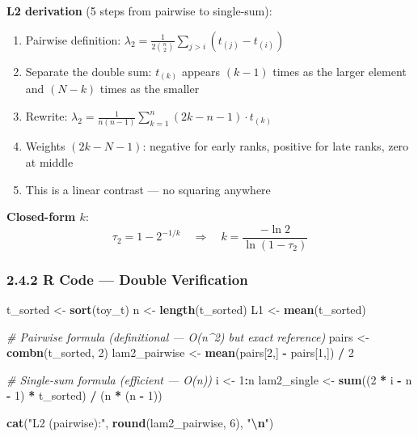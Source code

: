 \documentclass[
]{article}
\newenvironment{Shaded}{\begin{snugshade}}{\end{snugshade}}
\newcommand{\CommentTok}[1]{\textcolor[rgb]{0.56,0.35,0.01}{\textit{#1}}}
\newcommand{\DecValTok}[1]{\textcolor[rgb]{0.00,0.00,0.81}{#1}}
\newcommand{\FunctionTok}[1]{\textcolor[rgb]{0.13,0.29,0.53}{\textbf{#1}}}
\newcommand{\NormalTok}[1]{#1}
\newcommand{\OtherTok}[1]{\textcolor[rgb]{0.56,0.35,0.01}{#1}}
\newcommand{\SpecialCharTok}[1]{\textcolor[rgb]{0.81,0.36,0.00}{\textbf{#1}}}
\newcommand{\StringTok}[1]{\textcolor[rgb]{0.31,0.60,0.02}{#1}}
\providecommand{\tightlist}{%
  \setlength{\itemsep}{0pt}\setlength{\parskip}{0pt}}
\begin{document}
\textbf{L2 derivation} (5 steps from pairwise to single-sum):

\begin{enumerate}
\def\labelenumi{\arabic{enumi}.}
\tightlist
\item
  Pairwise definition:
  \(\lambda_2 = \frac{1}{2\binom{n}{2}} \sum_{j>i}(t_{(j)} - t_{(i)})\)
\item
  Separate the double sum: \(t_{(k)}\) appears \((k-1)\) times as the
  larger element and \((N-k)\) times as the smaller
\item
  Rewrite:
  \(\lambda_2 = \frac{1}{n(n-1)} \sum_{k=1}^n (2k - n - 1) \cdot t_{(k)}\)
\item
  Weights \((2k-N-1)\): negative for early ranks, positive for late
  ranks, zero at middle
\item
  This is a linear contrast --- no squaring anywhere
\end{enumerate}

\textbf{Closed-form \(k\)}:
\[\tau_2 = 1 - 2^{-1/k} \quad \Rightarrow \quad k = \frac{-\ln 2}{\ln(1-\tau_2)}\]

\subsubsection{2.4.2 R Code --- Double
Verification}\label{r-code-double-verification}

\begin{Shaded}
\begin{Highlighting}[]
\NormalTok{t\_sorted }\OtherTok{\textless{}{-}} \FunctionTok{sort}\NormalTok{(toy\_t)}
\NormalTok{n }\OtherTok{\textless{}{-}} \FunctionTok{length}\NormalTok{(t\_sorted)}
\NormalTok{L1 }\OtherTok{\textless{}{-}} \FunctionTok{mean}\NormalTok{(t\_sorted)}

\CommentTok{\# Pairwise formula (definitional — O(n\^{}2) but exact reference)}
\NormalTok{pairs }\OtherTok{\textless{}{-}} \FunctionTok{combn}\NormalTok{(t\_sorted, }\DecValTok{2}\NormalTok{)}
\NormalTok{lam2\_pairwise }\OtherTok{\textless{}{-}} \FunctionTok{mean}\NormalTok{(pairs[}\DecValTok{2}\NormalTok{,] }\SpecialCharTok{{-}}\NormalTok{ pairs[}\DecValTok{1}\NormalTok{,]) }\SpecialCharTok{/} \DecValTok{2}

\CommentTok{\# Single{-}sum formula (efficient — O(n))}
\NormalTok{i }\OtherTok{\textless{}{-}} \DecValTok{1}\SpecialCharTok{:}\NormalTok{n}
\NormalTok{lam2\_single }\OtherTok{\textless{}{-}} \FunctionTok{sum}\NormalTok{((}\DecValTok{2} \SpecialCharTok{*}\NormalTok{ i }\SpecialCharTok{{-}}\NormalTok{ n }\SpecialCharTok{{-}} \DecValTok{1}\NormalTok{) }\SpecialCharTok{*}\NormalTok{ t\_sorted) }\SpecialCharTok{/}\NormalTok{ (n }\SpecialCharTok{*}\NormalTok{ (n }\SpecialCharTok{{-}} \DecValTok{1}\NormalTok{))}

\FunctionTok{cat}\NormalTok{(}\StringTok{"L2 (pairwise):"}\NormalTok{, }\FunctionTok{round}\NormalTok{(lam2\_pairwise, }\DecValTok{6}\NormalTok{), }\StringTok{"}\SpecialCharTok{\textbackslash{}n}\StringTok{"}\NormalTok{)}
\end{Highlighting}
\end{Shaded}
\end{document}
